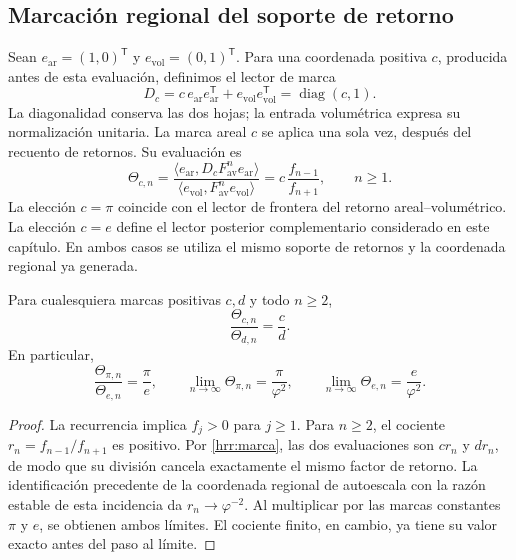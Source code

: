 \subsection{Marcación regional del soporte de retorno}

Sean \(e_{\mathrm{ar}}=(1,0)^{\mathsf T}\) y
\(e_{\mathrm{vol}}=(0,1)^{\mathsf T}\). Para una coordenada positiva
\(c\), producida antes de esta evaluación, definimos el lector de marca
\[
 D_c=c\,e_{\mathrm{ar}}e_{\mathrm{ar}}^{\mathsf T}
       +e_{\mathrm{vol}}e_{\mathrm{vol}}^{\mathsf T}
     =\operatorname{diag}(c,1).
\]
La diagonalidad conserva las dos hojas; la entrada volumétrica expresa
su normalización unitaria. La marca areal \(c\) se aplica una sola vez,
después del recuento de retornos. Su evaluación es
\begin{equation}
 \Theta_{c,n}=
 \frac{\langle e_{\mathrm{ar}},D_c F_{\mathrm{av}}^n
 e_{\mathrm{ar}}\rangle}
 {\langle e_{\mathrm{vol}},F_{\mathrm{av}}^n
 e_{\mathrm{vol}}\rangle}
 =c\,\frac{f_{n-1}}{f_{n+1}},\qquad n\geq1.
 \label{hrr:marca}
\end{equation}
La elección \(c=\pi\) coincide con el lector de frontera del retorno
areal--volumétrico. La elección \(c=e\) define el lector posterior
complementario considerado en este capítulo. En ambos casos se utiliza
el mismo soporte de retornos y la coordenada regional ya generada.

\begin{theorem}
\label{hrr:cociente}
Para cualesquiera marcas positivas \(c,d\) y todo \(n\geq2\),
\begin{equation}
 \frac{\Theta_{c,n}}{\Theta_{d,n}}=\frac cd.
 \label{hrr:cociente-exacto}
\end{equation}
En particular,
\begin{equation}
 \frac{\Theta_{\pi,n}}{\Theta_{e,n}}=\frac\pi e,
 \qquad
 \lim_{n\to\infty}\Theta_{\pi,n}=\frac\pi{\varphi^2},
 \qquad
 \lim_{n\to\infty}\Theta_{e,n}=\frac e{\varphi^2}.
 \label{hrr:pi-e-phi}
\end{equation}
\end{theorem}
\begin{proof}
La recurrencia implica \(f_j>0\) para \(j\geq1\). Para \(n\geq2\),
el cociente \(r_n=f_{n-1}/f_{n+1}\) es positivo. Por
\eqref{hrr:marca}, las dos evaluaciones son \(cr_n\) y \(dr_n\),
de modo que su división cancela exactamente el mismo factor de retorno.
La identificación precedente de la coordenada regional de autoescala
con la razón estable de esta incidencia da
\(r_n\to\varphi^{-2}\). Al multiplicar por las marcas constantes
\(\pi\) y \(e\), se obtienen ambos límites. El cociente finito,
en cambio, ya tiene su valor exacto antes del paso al límite.
\end{proof}

